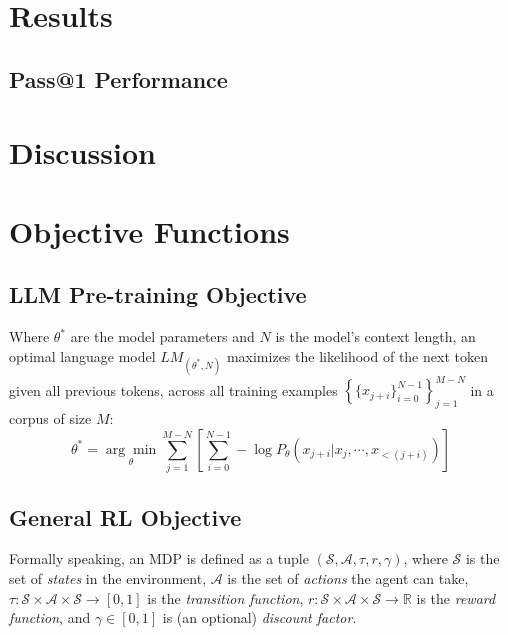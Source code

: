 \documentclass{article} %
\theoremstyle{definition}
\begin{document}
\section{Results}
\subsection{Pass@1 Performance}


\section{Discussion}



\appendix
\section{Objective Functions}
\subsection{LLM Pre-training Objective}

Where $\theta^{*}$ are the model parameters and $N$ is the model's context length, 
an optimal language model $LM_{(\theta^{*}, N)}$
maximizes the likelihood of the next token given all previous tokens, across all training examples
$\left\{\{x_{j + i}\}_{i = 0}^{N - 1}\right\}_{j = 1}^{M - N}$ 
in a corpus of size $M$:
\begin{equation} \label{eq:pretrain-obj}
    \theta^{*} = \underset{\theta}{\arg\min} \sum_{j = 1}^{M - N} \left[\sum_{i = 0}^{N - 1} -\log P_{\theta}(x_{j + i} | x_j, \cdots, x_{< (j + i)})\right]
\end{equation}

\subsection{General RL Objective}
\label{sec:rl-obj}

Formally speaking, an MDP is defined as a tuple $(\mathcal{S}, \mathcal{A}, \tau, r, \gamma)$, 
where $\mathcal{S}$ is the set of \textit{states} in the environment, 
$\mathcal{A}$ is the set of \textit{actions} the agent can take,
$\tau: \mathcal{S} \times \mathcal{A} \times \mathcal{S} \rightarrow [0, 1]$ is the \textit{transition function},
$r: \mathcal{S} \times \mathcal{A} \times \mathcal{S} \rightarrow \mathbb{R}$ is the \textit{reward function}, and 
$\gamma \in [0, 1]$ is (an optional) \textit{discount factor}.
\end{document}
